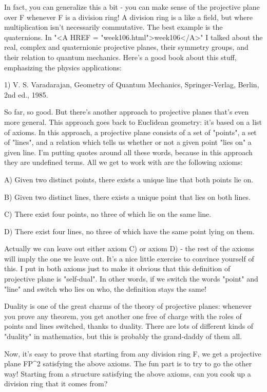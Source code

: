 In fact, you can generalize this a bit - you can make sense of the
projective plane over F whenever F is a division ring!  A division ring
is a like a field, but where multiplication isn't necessarily
commutative.  The best example is the quaternions.  In "<A HREF = "week106.html">week106</A>" 
I talked about the real, complex and quaternionic projective planes, 
their symmetry groups, and their relation to quantum mechanics.  Here's 
a good book about this stuff, emphasizing the physics applications:

1) V. S. Varadarajan, Geometry of Quantum Mechanics, Springer-Verlag,
Berlin, 2nd ed., 1985.  
 
So far, so good.  But there's another approach to projective planes
that's even more general.  This approach goes back to Euclidean
geometry: it's based on a list of axioms.  In this approach, a
projective plane consists of a set of "points", a set of "lines", and 
a relation which tells us whether or not a given point "lies on" a 
given line.  I'm putting quotes around all these words, because in this
approach they are undefined terms.  All we get to work with are the
following axioms:

A) Given two distinct points, there exists a unique line that both
points lie on.

B) Given two distinct lines, there exists a unique point that lies on
both lines.

C) There exist four points, no three of which lie on the same line.

D) There exist four lines, no three of which have the same point lying
on them.  

Actually we can leave out either axiom C) or axiom D) - the rest of the
axioms will imply the one we leave out.  It's a nice little exercise to
convince yourself of this.  I put in both axioms just to make it obvious
that this definition of projective plane is "self-dual".  In other
words, if we switch the words "point" and "line" and switch who lies on
who, the definition stays the same!  

Duality is one of the great charms of the theory of projective planes:
whenever you prove any theorem, you get another one free of charge with
the roles of points and lines switched, thanks to duality.  There are
lots of different kinds of "duality" in mathematics, but this is
probably the grand-daddy of them all.

Now, it's easy to prove that starting from any division ring F, we get a
projective plane FP^{2} satisfying the above axioms.  The fun part 
is to try to go the other way!  Starting from a structure satisfying the
above axioms, can you cook up a division ring that it comes from?  

